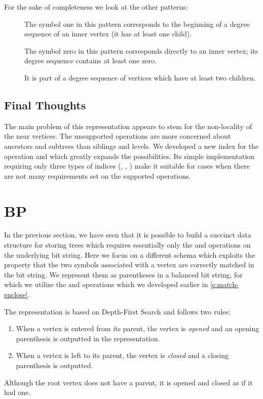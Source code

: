 \bigbreak

For the sake of completeness we look at the other patterns:
\begin{description}
	\item[]
	The symbol one in this pattern corresponds to the beginning of a degree sequence of an inner vertex (it has at least one child).
	\item[]
	The symbol zero in this pattern corresponds directly to an inner vertex; its degree sequence contains at least one zero.
	\item[]
	It is part of a degree sequence of vertices which have at least two children.
\end{description}

\subsection{Final Thoughts}

The main problem of this representation appears to stem for the non-locality of the near vertices.
The unsupported operations are more concerned about ancestors and subtrees than siblings and levels.
We developed a new index for the operation \dep{} and \levelAny{} which greatly expands the possibilities.
Its simple implementation requiring only three types of indices (\rank{}, \select{}, \blockOfD{}) make it suitable for cases when there are not many requirements set on the supported operations.

\section{BP}

In the previous section, we have seen that it is possible to build a succinct data structure for storing trees which requires essentially only the \rank{} and \select{} operations on the underlying bit string.
Here we focus on a different schema which exploits the property that the two symbols associated with a vertex are correctly matched in the bit string.
We represent them as parentheses in a balanced bit string, for which we utilize the \match{} and \enclose{} operations which we developed earlier in \ref{s:match-enclose}.

The representation is based on Depth-First Search and follows two rules:
\begin{enumerate}
	\item When a vertex is entered from its parent, the vertex is \emph{opened} and an opening parenthesis is outputted in the representation.
	\item When a vertex is left to its parent, the vertex is \emph{closed} and a closing parenthesis is outputted.
\end{enumerate}
Although the root vertex does not have a parent, it is opened and closed as if it had one.

